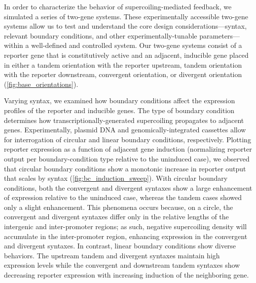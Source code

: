 \documentclass[11pt]{article}
\begin{document}
In order to characterize the behavior of supercoiling-mediated feedback, we simulated a series of two-gene systems. These experimentally accessible two-gene systems allow us to test and understand the core design considerations---syntax, relevant boundary conditions, and other experimentally-tunable parameters---within a well-defined and controlled system. Our two-gene systems consist of a reporter gene that is constitutively active and an adjacent, inducible gene placed in either a tandem orientation with the reporter upstream, tandem orientation with the reporter downstream, convergent orientation, or divergent orientation (\cref{fig:base_orientations}).

Varying syntax, we examined how boundary conditions affect the expression profiles of the reporter and inducible genes. The type of boundary condition determines how transcriptionally-generated supercoiling propagates to adjacent genes. Experimentally, plasmid DNA and genomically-integrated cassettes allow for interrogation of circular and linear boundary conditions, respectively.  Plotting reporter expression as a function of adjacent gene induction (normalizing reporter output per boundary-condition type relative to the uninduced case), we observed that circular boundary conditions show a monotonic increase in reporter output that scales by syntax (\cref{fig:bc_induction_sweep}). With circular boundary conditions, both the convergent and divergent syntaxes show a large enhancement of expression relative to the uninduced case, whereas the tandem cases showed only a slight enhancement. This phenomena occurs because, on a circle, the convergent and divergent syntaxes differ only in the relative lengths of the intergenic and inter-promoter regions; as such, negative supercoiling density will accumulate in the inter-promoter region, enhancing expression in the convergent and divergent syntaxes. In contrast, linear boundary conditions show diverse behaviors. The upstream tandem and divergent syntaxes maintain high expression levels while the convergent and downstream tandem syntaxes show decreasing reporter expression with increasing induction of the neighboring gene.
\end{document}
